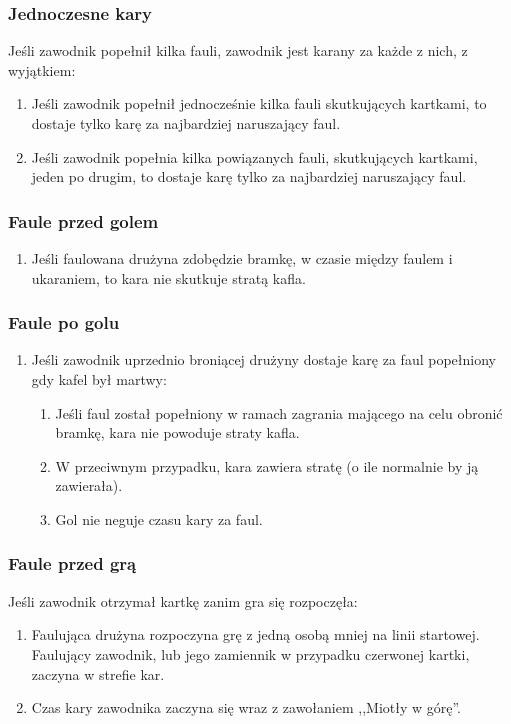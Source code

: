 \documentclass[11pt,a4paper]{article}
\begin{document}
\subsubsection{Jednoczesne kary}
Jeśli zawodnik popełnił kilka fauli, zawodnik jest karany za każde z nich, z wyjątkiem:
\begin{enumerate}
  \item Jeśli zawodnik popełnił jednocześnie kilka fauli skutkujących kartkami, to dostaje tylko karę za najbardziej naruszający faul.
  \item Jeśli zawodnik popełnia kilka powiązanych fauli, skutkujących kartkami, jeden po drugim, to dostaje karę tylko za najbardziej naruszający faul.
\end{enumerate}

\subsubsection{Faule przed golem}
\begin{enumerate}
  \item Jeśli faulowana drużyna zdobędzie bramkę, w czasie między faulem i ukaraniem, to kara nie skutkuje stratą kafla.
\end{enumerate}

\subsubsection{Faule po golu}
\begin{enumerate}
  \item Jeśli zawodnik uprzednio broniącej drużyny dostaje karę za faul popełniony gdy kafel był martwy:
  \begin{enumerate}
    \item Jeśli faul został popełniony w ramach zagrania mającego na celu obronić bramkę, kara nie powoduje straty kafla.
    \item W przeciwnym przypadku, kara zawiera stratę (o ile normalnie by ją zawierała).
    \item Gol nie neguje czasu kary za faul.
  \end{enumerate}
\end{enumerate}

\subsubsection{Faule przed grą}
Jeśli zawodnik otrzymał kartkę zanim gra się rozpoczęła:
\begin{enumerate}
  \item Faulująca drużyna rozpoczyna grę z jedną osobą mniej na linii startowej. Faulujący zawodnik, lub jego zamiennik w przypadku czerwonej kartki, zaczyna w strefie kar.
  \item Czas kary zawodnika zaczyna się wraz z zawołaniem ,,Miotły w górę''.
\end{enumerate}
\end{document}

